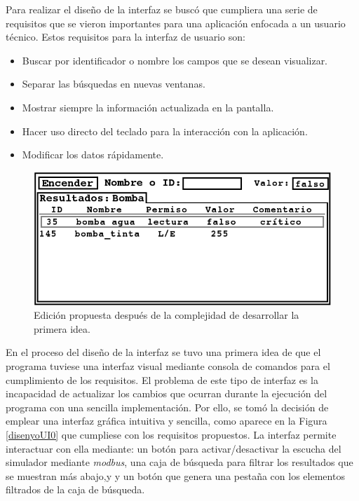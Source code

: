 \documentclass[pdftex,11pt,a4paper]{book}
\begin{document}
Para realizar el diseño de la interfaz se buscó que cumpliera una serie de requisitos que se vieron importantes para una aplicación enfocada a un usuario técnico. Estos requisitos para la interfaz de usuario son:

\begin{itemize}
\item Buscar por identificador o nombre los campos que se desean visualizar.
\item Separar las búsquedas en nuevas ventanas.
\item Mostrar siempre la información actualizada en la pantalla.
\item Hacer uso directo del teclado para la interacción con la aplicación.
\item Modificar los datos rápidamente.
\end{itemize}

\begin{figure}
\includegraphics[width=\textwidth]{img/disenyo_ui1.png}
\caption{\label{disenyoUI1}Edición propuesta después de la complejidad de desarrollar la primera idea.}
\end{figure}

En el proceso del diseño de la interfaz se tuvo una primera idea de que el programa tuviese una interfaz visual mediante consola de comandos para el cumplimiento de los requisitos. El problema de este tipo de interfaz es la incapacidad de actualizar los cambios que ocurran durante la ejecución del programa con una sencilla implementación. Por ello, se tomó la decisión de emplear una interfaz gráfica intuitiva y sencilla, como aparece en la Figura \ref{disenyoUI0} que cumpliese con los requisitos propuestos. La interfaz permite interactuar con ella mediante: un botón para activar/desactivar la escucha del simulador mediante \emph{modbus}, una caja de búsqueda para filtrar los resultados que se muestran más abajo,y y un botón que genera una pestaña con los elementos filtrados de la caja de búsqueda.
\end{document}
